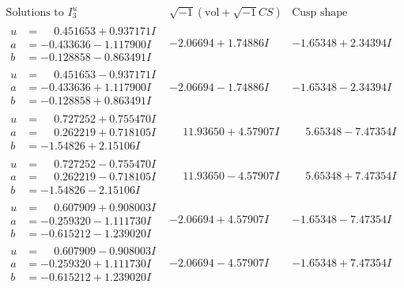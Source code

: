 \documentclass[1p]{elsarticle_modified}
\theoremstyle{definition}
\newcommand{\I}{\sqrt{-1}}
\begin{document}
$$\begin{array}{c|c|c}  
\text{Solutions to }I^u_{3}& \I (\text{vol} + \sqrt{-1}CS) & \text{Cusp shape}\\
 \hline 
\begin{aligned}
u &= \phantom{-}0.451653 + 0.937171 I \\
a &= -0.433636 - 1.117900 I \\
b &= -0.128858 - 0.863491 I\end{aligned}
 & -2.06694 + 1.74886 I & -1.65348 + 2.34394 I \\ \hline\begin{aligned}
u &= \phantom{-}0.451653 - 0.937171 I \\
a &= -0.433636 + 1.117900 I \\
b &= -0.128858 + 0.863491 I\end{aligned}
 & -2.06694 - 1.74886 I & -1.65348 - 2.34394 I \\ \hline\begin{aligned}
u &= \phantom{-}0.727252 + 0.755470 I \\
a &= \phantom{-}0.262219 + 0.718105 I \\
b &= -1.54826 + 2.15106 I\end{aligned}
 & \phantom{-}11.93650 + 4.57907 I & \phantom{-}5.65348 - 7.47354 I \\ \hline\begin{aligned}
u &= \phantom{-}0.727252 - 0.755470 I \\
a &= \phantom{-}0.262219 - 0.718105 I \\
b &= -1.54826 - 2.15106 I\end{aligned}
 & \phantom{-}11.93650 - 4.57907 I & \phantom{-}5.65348 + 7.47354 I \\ \hline\begin{aligned}
u &= \phantom{-}0.607909 + 0.908003 I \\
a &= -0.259320 - 1.111730 I \\
b &= -0.615212 - 1.239020 I\end{aligned}
 & -2.06694 + 4.57907 I & -1.65348 - 7.47354 I \\ \hline\begin{aligned}
u &= \phantom{-}0.607909 - 0.908003 I \\
a &= -0.259320 + 1.111730 I \\
b &= -0.615212 + 1.239020 I\end{aligned}
 & -2.06694 - 4.57907 I & -1.65348 + 7.47354 I \\ \hline\begin{aligned}

\end{aligned}
\end{array}$$
\end{document}
